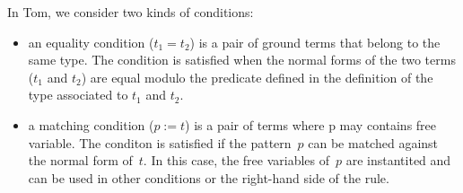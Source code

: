 In Tom, we consider two kinds of conditions:
\begin{itemize}
\item an equality condition ($t_1 = t_2$) is a pair of ground terms that
  belong to the same type.
  The condition is satisfied when the normal forms of the two terms
  ($t_1$ and $t_2$) are equal modulo the  predicate defined in
  the definition of the type associated to $t_1$ and $t_2$.
\item a matching condition ($p := t$) is a pair of terms where p may
  contains free variable. The conditon is satisfied if the pattern~$p$
  can be matched against the normal form of~$t$. In this case, the
  free variables of~$p$ are instantited and can be used in other
  conditions or the right-hand side of the rule.
\end{itemize}